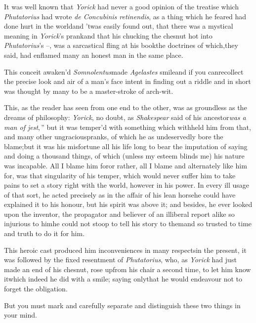 \documentclass{article}
\begin{document}
It was well known that \textit{Yorick} had never a good opinion of
the treatise which\break
\textit{Phutatorius} had wrote \textit{de Concubinis
retinendis}, as a thing which he feared had done hurt in the
world\tsk and ’twas easily found out, that there was a
mystical meaning in \textit{Yorick}’s prank\tsk and that his
chucking the chesnut hot into \textit{Phutatorius}’s
\hbox{–}, 
was a sarcastical fling at his book\tsk the doctrines
of which,\break they said, had enflamed many an honest man in the
same place.

This conceit awaken’d \textit{Somnolentus}\tsh made
\textit{Agelastes} smile\tsk and if you can\break recollect the
precise look and air of a man’s face intent in finding out a
riddle\tsk{} and in short was thought by many to be a master-stroke
of arch-wit.

This, as the reader has seen from one end to the other, was as
groundless as the dreams of philosophy: \textit{Yorick}, no doubt, as
\textit{Shakespear} said of his ancestor\break\tsk\lqq\textit{was
a man of jest},\,” but it was temp\-er’d with something
which withheld him from that, and many other ungracious\break pranks, of
which he as undeservedly\break
bore the blame;\tsk but it was his
misfortune all his life long to bear the imputation of saying and
doing a thousand things, of which (unless my esteem blinds me) his
nature was incapable. All I\pb
blame him for\tsk or rather, all I blame and alternately like him for, was that
singularity of his temper, which would never suffer him to take pains to set a story
right with the world, however in his power. In every ill usage of that sort, he
acted precisely as in the affair of his lean horse\tsk he could have explained it to
his honour, but his spirit was above it; and besides, he ever looked upon the
inventor, the propagator and believer of an illiberal report alike so injurious to
him\tsk he could not stoop to tell his story to them\tsk and so trusted to time and
truth to do it for him.

This heroic cast produced him inconveniences in many
respects\tsk in the pre\-sent, it was followed by the fixed
resentment of \textit{Phutatorius}, who, as \textit{Yorick} had just
made an end of his chesnut, rose up\pb from his chair a second time,
to let him know it\tsk which indeed he did with a smile; saying
only\tsk that he would endeavour not to forget the
obligation.

But you must mark and carefully separate and distinguish these
two things in your mind.
\end{document}
